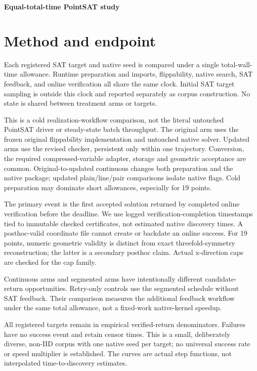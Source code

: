 \documentclass[10pt,a4paper]{article}
\begin{document}
\begin{center}{\Large\bfseries Equal-total-time PointSAT study}\end{center}

\section*{Method and endpoint}

Each registered SAT target and native seed is compared under a single total-wall-time allowance. Runtime preparation and imports, flippability, native search, SAT feedback, and online verification all share the same clock. Initial SAT target sampling is outside this clock and reported separately as corpus construction. No state is shared between treatment arms or targets.

This is a cold realization-workflow comparison, not the literal untouched PointSAT driver or steady-state batch throughput. The original arm uses the frozen original flippability implementation and untouched native solver. Updated arms use the revised checker, persistent only within one trajectory. Conversion, the required compressed-variable adapter, storage and geometric acceptance are common. Original-to-updated continuous changes both preparation and the native package; updated plain/line/pair comparisons isolate native flags. Cold preparation may dominate short allowances, especially for 19 points.

The primary event is the first accepted solution returned by completed online verification before the deadline. We use logged verification-completion timestamps tied to immutable checked certificates, not estimated native discovery times. A posthoc-valid coordinate file cannot create or backdate an online success. For 19 points, numeric geometric validity is distinct from exact threefold-symmetry reconstruction; the latter is a secondary posthoc claim. Actual x-direction caps are checked for the cap family.

Continuous arms and segmented arms have intentionally different candidate-return opportunities. Retry-only controls use the segmented schedule without SAT feedback. Their comparison measures the additional feedback workflow under the same total allowance, not a fixed-work native-kernel speedup.

All registered targets remain in empirical verified-return denominators. Failures have no success event and retain censor times. This is a small, deliberately diverse, non-IID corpus with one native seed per target; no universal success rate or speed multiplier is established. The curves are actual step functions, not interpolated time-to-discovery estimates.
\end{document}

